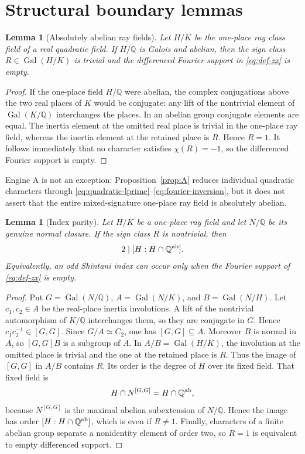 \documentclass[11pt]{article}
\newtheorem{lemma}[theorem]{Lemma}
\newcommand{\Q}{\mathbb Q}
\newcommand{\Gal}{\operatorname{Gal}}
\begin{document}
\section{Structural boundary lemmas}

\begin{lemma}[Absolutely abelian ray fields]\label{lem:noD}
Let \(H/K\) be the one-place ray class field of a real quadratic
field.  If \(H/\Q\) is Galois and abelian, then the sign class
\(R\in\Gal(H/K)\) is trivial and the differenced Fourier support in
\eqref{eq:def-zx} is empty.
\end{lemma}

\begin{proof}
If the one-place field \(H/\Q\) were abelian, the complex
conjugations above the two real places of \(K\) would be conjugate:
any lift of the nontrivial element of \(\Gal(K/\Q)\) interchanges the
places.  In an abelian group conjugate elements are equal.  The
inertia element at the omitted real place is trivial in the one-place
ray field, whereas the inertia element at the retained place is
\(R\).  Hence \(R=1\).  It follows immediately that no character
satisfies \(\chi(R)=-1\), so the differenced Fourier support is empty.
\end{proof}

Engine A is not an exception: Proposition~\ref{prop:A} reduces
individual quadratic characters through
\eqref{eq:quadratic-lprime}--\eqref{eq:fourier-inversion}, but it does not
assert that the entire mixed-signature one-place ray field is
absolutely abelian.

\begin{lemma}[Index parity]\label{lem:parity}
Let \(H/K\) be a one-place ray field and let \(N/\Q\) be its genuine
normal closure.  If the sign class \(R\) is nontrivial, then
\begin{equation}\label{eq:index-parity}
 2\mid[H:H\cap\Q^{\rm ab}].
\end{equation}
Equivalently, an odd Shintani index can occur only when the Fourier
support of \eqref{eq:def-zx} is empty.
\end{lemma}

\begin{proof}
Put \(G=\Gal(N/\Q)\), \(A=\Gal(N/K)\), and
\(B=\Gal(N/H)\).  Let \(c_1,c_2\in A\) be the real-place inertia
involutions.  A lift of the nontrivial automorphism of \(K/\Q\)
interchanges them, so they are conjugate in \(G\).  Hence
\(c_1c_2^{-1}\in[G,G]\).  Since \(G/A\simeq C_2\), one has
\([G,G]\subseteq A\).  Moreover \(B\) is normal in \(A\), so
\([G,G]B\) is a subgroup of \(A\).  In \(A/B=\Gal(H/K)\), the
involution at the
omitted place is trivial and the one at the retained place is \(R\).
Thus the image of \([G,G]\) in \(A/B\) contains \(R\).  Its order is
the degree of \(H\) over its fixed field.  That fixed field is
\[
 H\cap N^{[G,G]}=H\cap\Q^{\rm ab},
\]
because \(N^{[G,G]}\) is the maximal abelian subextension of
\(N/\Q\).  Hence the image has order
\([H:H\cap\Q^{\rm ab}]\), which is even if \(R\ne1\).
Finally, characters of a finite abelian group separate a nonidentity
element of order two, so \(R=1\) is equivalent to empty differenced
support.
\end{proof}
\end{document}
